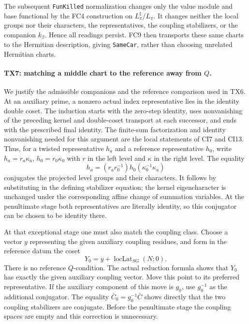 The subsequent \texttt{FunKilled} normalization changes only the
value module and base functional by the FC4 construction on
\(L_\pi^\sharp/L_\pi\).
It changes neither the local groups nor their characters, the
representatives, the coupling stabilizers, or the companion
\(k_\beta\). Hence all readings persist. FC9 then transports
these same charts to the Hermitian description, giving
\texttt{SameCar}, rather than choosing unrelated Hermitian charts.

\paragraph{TX7: matching a middle chart to the reference away from \(Q\).}
We justify the admissible companions and the reference comparison
used in TX6. At an auxiliary prime, a nonzero actual index
representative lies in the identity double coset. The induction
starts with the zero-step identity, uses nonvanishing of the
preceding kernel and double-coset transport at each successor,
and ends with the prescribed final identity. The finite-sum
factorization and identity nonvanishing needed for this argument
are the local statements of CI7 and CI13. Thus, for a twisted
representative \(h_a\) and a reference representative \(h_0\),
write \(h_a=r_a\kappa_a\), \(h_0=r_0\kappa_0\) with \(r\) in
the left level and \(\kappa\) in the right level. The equality
\[
 h_a=(r_ar_0^{-1})h_0(\kappa_0^{-1}\kappa_a)
 \tag{TX7.1}
\]
conjugates the projected level groups and their characters.
It follows by substituting in the defining stabilizer equation;
the kernel eigencharacter is unchanged under the corresponding
affine change of summation variables. At the penultimate stage
both representatives are literally identity, so this conjugator
can be chosen to be identity there.

At that exceptional stage one must also match the coupling class.
Choose a vector \(y\) representing the given auxiliary coupling
residues, and form in the reference datum the coset
\[
 Y_0=y+\operatorname{locLat}_{SG}(N;0).
 \tag{TX7.2}
\]
There is no reference \(Q\)-condition. The actual reduction
formula shows that \(Y_0\) has exactly the given auxiliary coupling
vector. Move this point to its preferred representative. If the
auxiliary component of this move is \(g_0\), use \(g_0^{-1}\)
as the additional conjugator. The equality
\(\bar C_0=g_0^{-1}\bar C\) shows directly that the two coupling
stabilizers are conjugate. Before the penultimate stage the
coupling spaces are empty and this correction is unnecessary.

